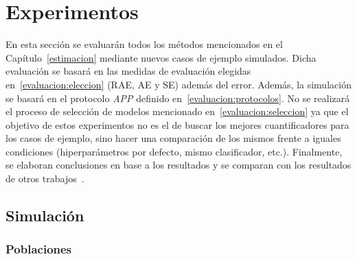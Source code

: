 \chapter{Experimentos}\label{experimentos}

En esta sección se evaluarán todos los métodos mencionados en el
Capítulo~\ref{estimacion} mediante nuevos casos de ejemplo simulados. Dicha
evaluación se basará en las medidas de evaluación elegidas
en~\ref{evaluacion:eleccion} (RAE, AE y SE) además del error. Además, la
simulación se basará en el protocolo {\it APP\/} definido
en~\ref{evaluacion:protocolos}. No se realizará el proceso de selección de
modelos mencionado en~\ref{evaluacion:seleccion} ya que el objetivo de estos
experimentos no es el de buscar los mejores cuantificadores para los casos de
ejemplo, sino hacer una comparación de los mismos frente a iguales condiciones
(hiperparámetros por defecto, mismo clasificador, etc.). Finalmente, se elaboran
conclusiones en base a los resultados y se comparan con los resultados de otros
trabajos~\cite{moreo2021re, moreo2022tweet, moreo2021quapy, tasche2016does,
schumacher2021comparative}.

\section{Simulación}\label{experimentos:simulacion}

\subsection{Poblaciones}\label{experimentos:poblaciones}

